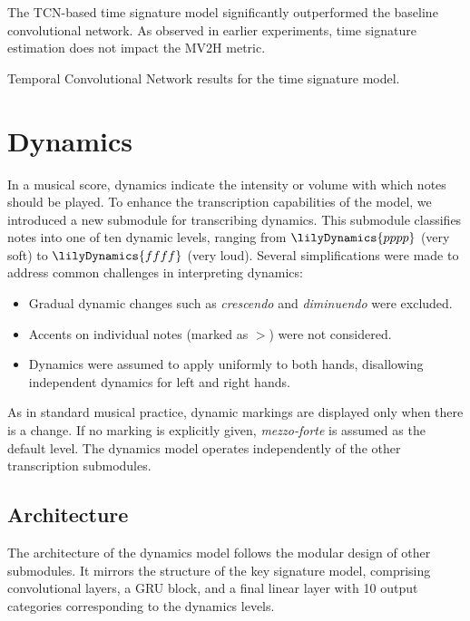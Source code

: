 The TCN-based time signature model significantly outperformed the baseline convolutional network. As observed in earlier experiments, time signature estimation does not impact the MV2H metric.

\begin{table}[ht!]
\centering

\caption[Temporal Convolutional Network results for the time signature model.]{Temporal Convolutional Network results for the time signature model.}
\label{time_signature_tcn}
\end{table}

\section{Dynamics}

In a musical score, dynamics indicate the intensity or volume with which notes should be played. To enhance the transcription capabilities of the model, we introduced a new submodule for transcribing dynamics. This submodule classifies notes into one of ten dynamic levels, ranging from $\lilyDynamics{pppp}$ (very soft) to $\lilyDynamics{ffff}$ (very loud). Several simplifications were made to address common challenges in interpreting dynamics:
\begin{itemize}
	\item Gradual dynamic changes such as \emph{crescendo} and \emph{diminuendo} were excluded.
	\item Accents on individual notes (marked as $>$) were not considered.
	\item Dynamics were assumed to apply uniformly to both hands, disallowing independent dynamics for left and right hands.
	\end{itemize}

As in standard musical practice, dynamic markings are displayed only when there is a change. If no marking is explicitly given, \emph{mezzo-forte} is assumed as the default level. The dynamics model operates independently of the other transcription submodules.

\subsection{Architecture}

The architecture of the dynamics model follows the modular design of other submodules. It mirrors the structure of the key signature model, comprising convolutional layers, a GRU block, and a final linear layer with 10 output categories corresponding to the dynamics levels.

